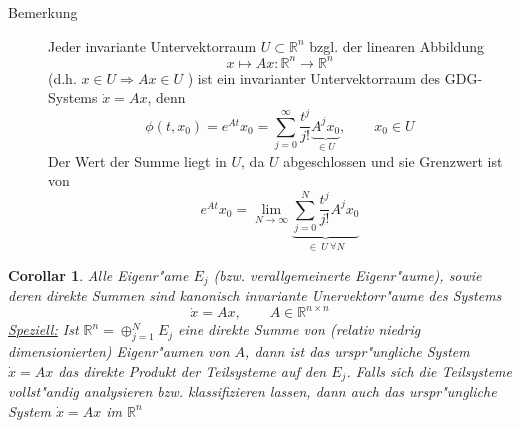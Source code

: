\documentclass[a4paper, 13pt]{scrreprt}
\newtheorem{corollar}[theorem]{Corollar}
\theoremstyle{definition} \newtheorem{definition}{Definition}[section]
\newcommand{\RR}{\mathbb{R}}
\begin{document}
\begin{description}
\item [Bemerkung]
	Jeder invariante Untervektorraum \(U \subset \RR^n \) bzgl. der linearen Abbildung 
		\[x \mapsto Ax : \RR^n \rightarrow \RR^n \]
(d.h. $x\in U\Rightarrow Ax \in U$ ) ist ein invarianter Untervektorraum des GDG-Systems \(\dot{x} = Ax\), denn
		\[\phi(t,x_0) = e^{At} x_0 = \sum_{j=0}^{\infty} \frac{t^j}{j!} \underbrace{A^j x_0}_{\in U}, \qquad x_0 \in U\]
Der Wert der Summe liegt in \(U\), da $U$ abgeschlossen und sie Grenzwert ist von
	\[ e^{At} x_0 = \lim_{N\to \infty} \underbrace{\sum_{j=0}^{N} \frac{t^j}{j!} A^j x_0 }_{\in\  U\ \forall N} \]
\end{description}

\begin{corollar}
	Alle Eigenr"ame \(E_j\) (bzw. verallgemeinerte Eigenr"aume), sowie deren direkte Summen sind kanonisch invariante Unervektorr"aume des Systems
		\[\dot{x} = Ax, \qquad A \in \RR^{n\times n} \]
	\underline{Speziell:} Ist \(\RR^n = \oplus_{j=1}^{N} E_j \) eine direkte Summe von (relativ niedrig dimensionierten) Eigenr"aumen von \(A\), dann ist das urspr"ungliche System \(\dot{x}=Ax\) das direkte Produkt der Teilsysteme auf den \(E_j\).
	Falls sich die Teilsysteme vollst"andig analysieren bzw. klassifizieren lassen, dann auch das urspr"ungliche System \(\dot{x} = Ax\) im \(\RR^n\)
\end{corollar}
\end{document}
